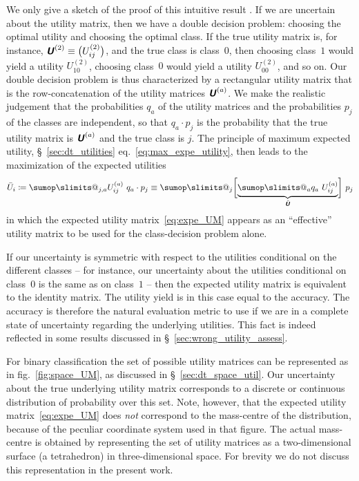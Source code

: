 \documentclass[\ifafour a4paper,12pt,\else a5paper,10pt,\fi%
onecolumn,oneside,article,%
british%
]{memoir}
\makeatletter
\theoremstyle{remark}
\theoremstyle{innote}
\def\sum{\DOTSI\sumop\slimits@}
\newcommand*{\mathte}[1]{\textbf{\textit{\textsf{#1}}}}
\newcommand*{\defd}{\coloneqq}
\renewcommand*{\|}[1][]{\nonscript\:#1\vert\nonscript\:\mathopen{}}
\newcommand*{\sect}{\S}%
\newcommand*{\chap}{ch.}%
\newcommand*{\eqn}{eq.}%
\newcommand*{\fig}{fig.}%
\newcommand*{\eg}{{e.g.}}
\newcommand*{\myhat}[1]{{\mkern1.5mu\skew{2}\hat{\mkern-1.5mu#1\mkern-1.5mu}\mkern 1.5mu}}
\newcommand*{\eu}{\bar{U}}
\newcommand*{\aveu}{\myhat{\mathte{U}}}
\newcommand*{\uncu}[1]{\mathte{U}^{(#1)}}
\makeatother
\begin{document}
We only give a sketch of the proof of this intuitive result  \autocites[see \eg][esp. \chap~3]{raiffa1968_r1970}. If we are uncertain about the utility matrix, then we have a double decision problem: choosing the optimal utility and choosing the optimal class. If the true utility matrix is, for instance, $\uncu{2} \equiv \bigl(U^{(2)}_{ij}\bigr)$, and the true class is class~$0$, then choosing class~$1$ would yield a utility $U^{(2)}_{10}$, choosing class~$0$ would yield a utility $U^{(2)}_{00}$, and so on. Our double decision problem is thus characterized by a rectangular utility matrix that is the row-concatenation of the utility matrices $\uncu{a}$. We make the realistic judgement that the probabilities $q_{a}$ of the utility matrices and the probabilities $p_{j}$ of the classes are independent, so that $q_{a}\cdot p_{j}$ is the probability that the true utility matrix is $\uncu{a}$ and the true class is $j$. The principle of maximum expected utility, \sect~\ref{sec:dt_utilities} \eqn~\eqref{eq:max_expe_utility}, then leads to the maximization of the expected utilities
\begin{equation}
  \label{eq:average_expe_utility}
  \eu_{i} \defd \sum_{j,a} U^{(a)}_{ij}\ q_{a}\cdot p_{j}
  \equiv \sum_{j} \biggl[\underbrace{\sum_{a} q_{a}\ U^{(a)}_{ij}}_{\aveu} \biggr]\ p_{j}
\end{equation}
in which the expected utility matrix~\eqref{eq:expe_UM} appears as an \enquote{effective} utility matrix to be used for the class-decision problem alone.

If our uncertainty is symmetric with respect to the utilities conditional on the different classes -- for instance, our uncertainty about the utilities conditional on class~$0$ is the same as on class~$1$ -- then the expected utility matrix is equivalent to the identity matrix. The utility yield is in this case equal to the accuracy. The accuracy is therefore the natural evaluation metric to use if we are in a complete state of uncertainty regarding the underlying utilities. This fact is indeed reflected in some results discussed in \sect~\ref{sec:wrong_utility_assess}.


For binary classification the set of possible utility matrices can be represented as in \fig~\ref{fig:space_UM}, as discussed in \sect~\ref{sec:dt_space_util}. Our uncertainty about the true underlying utility matrix corresponds to a discrete or continuous distribution of probability over this set. Note, however, that the expected utility matrix~\eqref{eq:expe_UM} does \emph{not} correspond to the mass-centre of the distribution, because of the peculiar coordinate system used in that figure. The actual mass-centre is obtained by representing the set of utility matrices as a two-dimensional surface (a tetrahedron) in three-dimensional space. For brevity we do not discuss this representation in the present work.
\end{document}
